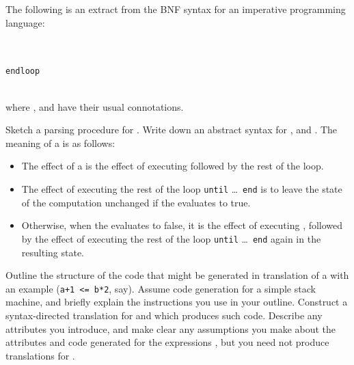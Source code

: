 \begin{questions}
The following is an extract from the BNF syntax for
an imperative programming language:
\begin{bnf}
\\
 \\
 \verb"endloop"\\
\\
\end{bnf}
where ,  and  have their usual connotations.
\begin{subquestions}
\subquestion
Sketch a parsing procedure for .
\subsubquestion
Write down an abstract syntax for ,  and .
\subquestion
The meaning of a  is as follows:
\begin{itemize}
\item The effect of a  is the effect of executing 
         followed by the rest of the loop.
\item The effect of executing the rest of the loop
        \verb|until| \ldots\ \verb|end|
        is to leave the
        state of the computation unchanged if the 
        evaluates to true.
\item Otherwise, when the  evaluates to false,
        it is the effect of executing ,
        followed by the effect of executing the rest of the loop
        \verb|until| \ldots\ \verb|end| again in the resulting state.
\end{itemize}
\begin{subsubquestions}
\subsubquestion
        Outline the structure of the
        code that might be generated in translation of
        a  with an example  (\verb"a+1 <= b*2", say). 
        Assume code generation for a simple
        stack machine, and briefly explain the
        instructions you use in your outline.
\subsubquestion
        Construct a syntax-directed translation for 
         and  which produces such code.
        Describe any attributes you
        introduce, and make clear any assumptions you make about 
        the attributes and code generated for the
        expressions , but you need not produce translations for
        .
\end{subsubquestions}
\end{subquestions}


\end{questions}
